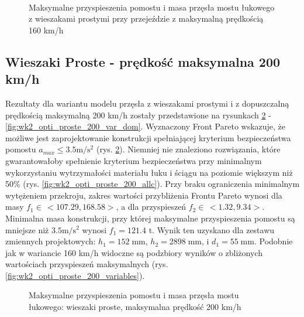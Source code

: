\begin{figure}[hbt!]
	\centering
	\\
	\captionsetup{justification=centering}
	\caption{Maksymalne przyspieszenia pomostu i masa przęsła mostu łukowego z wieszakami prostymi przy przejeździe z maksymalną prędkością 160 km/h}
	\label{fig:wk2_opti_proste_160_var_dom}
\end{figure}





\pagebreak[4]
\subsection{Wieszaki Proste - prędkość maksymalna 200 km/h}

Rezultaty dla wariantu modelu przęsła z wieszakami prostymi i z dopuszczalną prędkością maksymalną 200 km/h zostały przedstawione na rysunkach \ref{fig:wk2_opti_proste_200_all} - \ref{fig:wk2_opti_proste_200_var_dom}. Wyznaczony Front Pareto wskazuje, że możliwe jest zaprojektowanie konstrukcji spełniającej kryterium bezpieczeństwa pomostu $a_{max}\le 3.5 \mathrm{m/s^2}$ (rys. \ref{fig:wk2_opti_proste_200_all}). Niemniej nie znaleziono rozwiązania, które gwarantowałoby spełnienie kryterium bezpieczeństwa przy minimalnym wykorzystaniu wytrzymałości materiału łuku i ściągu na poziomie większym niż 50\% (rys. \ref{fig:wk2_opti_proste_200_allc}). Przy braku ograniczenia minimalnym wytężeniem przekroju, zakres wartości przybliżenia Frontu Pareto wynosi dla masy $f_1 \in\,<107.29,168.58>$, a dla przyspieszeń $f_2 \in\,<1.32,9.34>$. Minimalna masa konstrukcji, przy której maksymalne przyspieszenia pomostu są mniejsze niż $3.5 \mathrm{m/s^2}$ wynosi $f_1 = 121.4$ t. Wynik ten uzyskano dla zestawu zmiennych projektowych: $h_1 = 152\;\mathrm{mm}$, $h_2 = 2898\;\mathrm{mm}$, i $d_1 = 55\;\mathrm{mm}$. Podobnie jak w wariancie 160 km/h widoczne są podzbiory wyników o zbliżonych wartościach przyspieszeń maksymalnych (rys. \ref{fig:wk2_opti_proste_200_variables}).

\begin{figure}[hbt!]
	\centering
	\captionsetup{justification=centering}
	\caption{Maksymalne przyspieszenia pomostu i masa przęsła mostu łukowego: wieszaki proste, maksymalna prędkość 200 km/h}
	\label{fig:wk2_opti_proste_200_all}
\end{figure}

